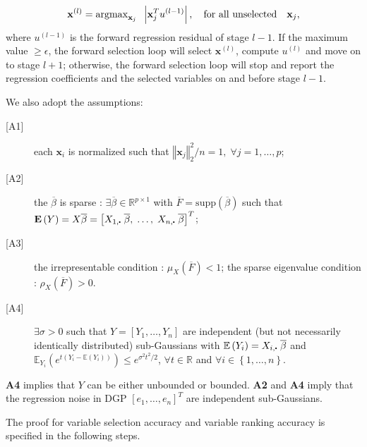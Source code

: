 \documentclass[11pt,review,authoryear]{elsarticle}
\begin{document}
\begin{appendices}
\begin{enumerate}
  \begin{displaymath}
    \mathbf{x}^{(l)} = \mathrm{argmax}_{\mathbf{x}_j} \;\; \left\vert \mathbf{x}_j^T u^{(l-1)} \right\vert, \\
    \quad\mbox{for all unselected}\quad\mathbf{x}_{j},
  \end{displaymath}
  where $u^{\left(l-1\right)}$ is the forward regression residual of stage $l-1$. If the maximum value $\geqslant\epsilon$, the forward selection loop will select $\mathbf{x}^{(l)}$, compute $u^{(l)}$ and move on to stage $l+1$; otherwise, the forward selection loop will stop and report the regression coefficients and the selected variables on and before stage $l-1$.
\end{enumerate}

We also adopt the \citet{zhang09} assumptions:
%
\begin{description}
  \item [{[}A1{]}] each $\mathbf{x}_i$ is normalized such that $\left\Vert \mathbf{x}_{j}\right\Vert _{2}^{2}/n=1,\;\forall j=1,\ldots,p$;
  \item [{[}A2{]}] the $\overline{\beta}$ is sparse : $\exists \overline{\beta} \in \mathbb{R}^{p\times 1}$ with $\overline{F} = \mathrm{supp} \left( \overline{\beta} \right)$ such that $ \mathbf{E} \left( Y \right) = X\overline{\beta} = \left[ X_{1,\bigcdot} \; \overline{\beta}, \;  \ldots, \; X_{n,\bigcdot} \; \overline{\beta} \right]^T$;
  \item [{[}A3{]}] the irrepresentable condition \citep{tropp2004greed}: $\mu_{X}\left(\overline{F}\right)<1$; the sparse eigenvalue condition \citep{wainwright2009sharp}: $\rho_{X}\left(\overline{F}\right)>0$.
  \item [{[}A4{]}] $\exists \sigma > 0$ such that $Y = \left[ Y_1, \ldots, Y_n \right]$ are independent (but not necessarily identically distributed) sub-Gaussians with $\mathbb{E} \left(Y_i\right)=  X_{i,\bigcdot} \; \overline{\beta}$ and $\mathbb{E}_{Y_i} \left( e^{t\left(Y_i - \mathbb{E} \left( Y_i \right) \right)}\right) \leqslant e^{\sigma^2t^2/2}$, $\forall t\in \mathbb{R}$ and $\forall i\in \left\{1,\ldots,n\right\}$.
\end{description}
%
\textbf{A4} implies that $Y$ can be either unbounded or bounded. \textbf{A2} and \textbf{A4} imply that the regression noise in DGP $\left[e_1, \ldots, e_n\right]^T$ are independent sub-Gaussians.

The proof for variable selection accuracy and variable ranking accuracy is specified in the following steps.


\end{appendices}
\end{document}
